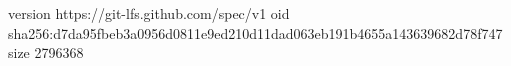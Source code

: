 version https://git-lfs.github.com/spec/v1
oid sha256:d7da95fbeb3a0956d0811e9ed210d11dad063eb191b4655a143639682d78f747
size 2796368

